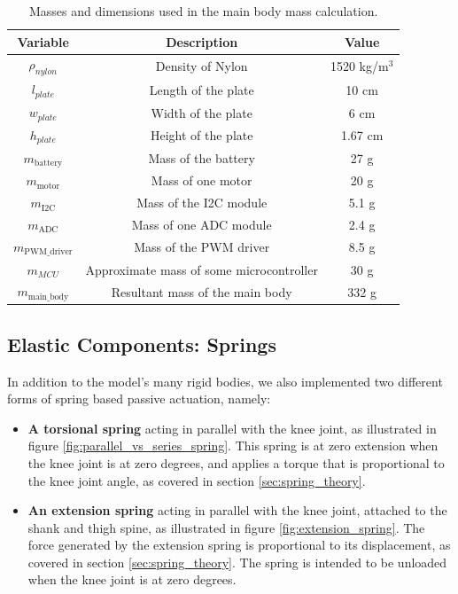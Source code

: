 \begin{table}
\centering
\begin{tabular}{|c|c|c|}
\hline
\textbf{Variable} & \textbf{Description} & \textbf{Value} \\
\hline
$\rho_{nylon}$ & Density of Nylon & 1520 kg/m$^3$  \\
$l_{plate}$ & Length of the plate & 10 cm \\
$w_{plate}$ & Width of the plate & 6 cm \\
$h_{plate}$ & Height of the plate & 1.67 cm \\
$m_{\text{battery}}$ & Mass of the battery & 27 g  \\
$m_{\text{motor}}$ & Mass of one motor & 20 g  \\
$m_{\text{I2C}}$ & Mass of the I2C module & 5.1 g  \\
$m_{\text{ADC}}$ & Mass of one ADC module & 2.4 g  \\
$m_{\text{PWM\_driver}}$ & Mass of the PWM driver & 8.5 g  \\
$m_{MCU}$ & Approximate mass of some microcontroller & 30 g \\
$m_{\text{main\_body}}$ & Resultant mass of the main body & 332 g \\
\hline
\end{tabular}
\caption{Masses and dimensions used in the main body mass calculation.}
\label{tab:component_masses}
\end{table}


\subsection{Elastic Components: Springs}

In addition to the model's many rigid bodies, we also implemented two different forms of spring based passive actuation, namely: 
\begin{itemize}
\item \textbf{A torsional spring} acting in parallel with the knee joint, as illustrated in figure \ref{fig:parallel_vs_series_spring}. This spring is at zero extension when the knee joint is at zero degrees, and applies a torque that is proportional to the knee joint angle, as covered in section \ref{sec:spring_theory}.
\item \textbf{An extension spring} acting in parallel with the knee joint, attached to the shank and thigh spine, as illustrated in figure \ref{fig:extension_spring}. The force generated by the extension spring is proportional to its displacement, as covered in section \ref{sec:spring_theory}. The spring is intended to be unloaded when the knee joint is at zero degrees.
\end{itemize}

